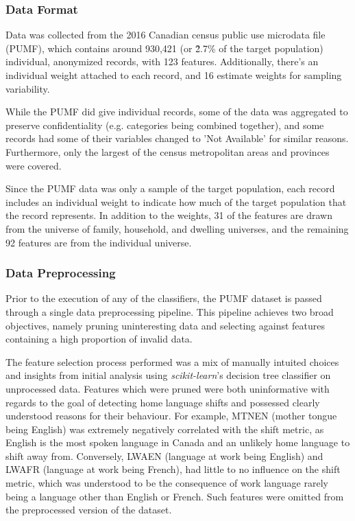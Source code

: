 \documentclass[10pt, conference, compsocconf]{IEEEtran}
\begin{document}
\subsubsection{Data Format}
Data was collected from the 2016 Canadian census public use microdata file (PUMF), which contains around 930,421 (or \~2.7\% of the target population) individual, anonymized records, with 123 features. Additionally, there's an individual weight attached to each record, and 16 estimate weights for sampling variability.

While the PUMF did give individual records, some of the data was aggregated to preserve confidentiality (e.g. categories being combined together), and some records had some of their variables changed to 'Not Available' for similar reasons. Furthermore, only the largest of the census metropolitan areas and provinces were covered. 

Since the PUMF data was only a sample of the target population, each record includes an individual weight to indicate how much of the target population that the record represents. In addition to the weights, 31 of the features are drawn from the universe of family, household, and dwelling universes, and the remaining 92 features are from the individual universe.

\subsubsection{Data Preprocessing}
Prior to the execution of any of the classifiers, the PUMF dataset is passed through a single data preprocessing pipeline.  This pipeline achieves two broad objectives, namely pruning uninteresting data and selecting against features containing a high proportion of invalid data.


The feature selection process performed was a mix of manually intuited choices and insights from initial analysis using \textit{scikit-learn}'s decision tree classifier on unprocessed data.  Features which were pruned were both uninformative with regards to the goal of detecting home language shifts and possessed clearly understood reasons for their behaviour.  For example, MTNEN (mother tongue being English) was extremely negatively correlated with the shift metric, as English is the most spoken language in Canada and an unlikely home language to shift away from.  Conversely, LWAEN (language at work being English) and LWAFR (language at work being French), had little to no influence on the shift metric, which was understood to be the consequence of work language rarely being a language other than English or French.  Such features were omitted from the preprocessed version of the dataset.
\end{document}
